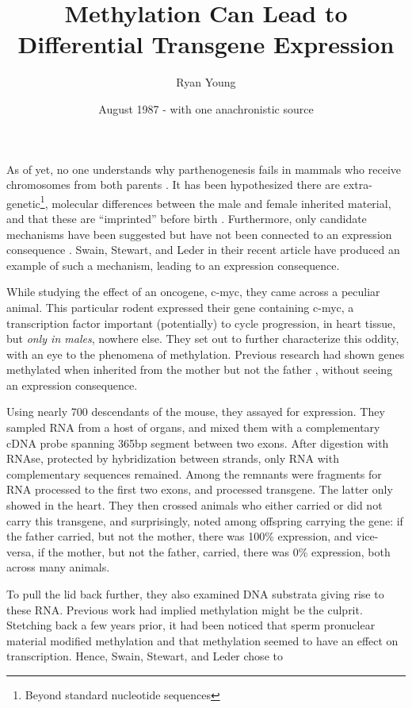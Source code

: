 \documentclass[twocolumn]{article}
\title{{\Large Methylation Can Lead to Differential Transgene Expression}}
\author{\large Ryan Young}
\date{August 1987 - with one anachronistic source}
\begin{document}
\maketitle


As of yet, no one understands why parthenogenesis fails in mammals who receive chromosomes from both parents \citep{solter}\citep{surani}. It has been hypothesized there are extra-genetic\footnote{Beyond standard nucleotide sequences}, molecular differences between the male and female inherited material, and that these are ``imprinted'' before birth \citep{surani}. Furthermore, only candidate mechanisms have been suggested but have not been connected to an expression consequence \citep{reik}. Swain, Stewart, and Leder in their recent article have produced an example of such a mechanism, leading to an expression consequence.

While studying the effect of an oncogene, c-myc, they came across a peculiar animal. This particular rodent expressed their gene containing c-myc, a transcription factor important (potentially) to cycle progression\citep{cymc}, in heart tissue, but \textit{only in males}, nowhere else. They set out to further characterize this oddity, with an eye to the phenomena of methylation. Previous research had shown genes methylated when inherited from the mother but not the father \citep{surani}, without seeing an expression consequence.

Using nearly 700 descendants of the mouse, they assayed for expression. They sampled RNA
from a host of organs, and mixed them with a complementary cDNA probe spanning 365bp segment between two exons. After digestion with RNAse, protected by hybridization between strands, only RNA with complementary sequences remained. Among the remnants were fragments for RNA processed to the first two exons, and processed transgene. The latter only showed in the heart. They then crossed animals who either carried or did not carry this transgene, and surprisingly, noted among offspring carrying the gene: if the father carried, but not the mother, there was 100\% expression, and vice-versa, if the mother, but not the father, carried, there was 0\% expression, both across many animals. 

To pull the lid back further, they also examined DNA substrata giving rise to these RNA. Previous work had implied methylation might be the culprit. Stetching back a few years prior, it had been noticed that sperm pronuclear material modified methylation\citep{} and that methylation seemed to have an effect on transcription\citep{}. Hence, Swain, Stewart, and Leder chose to 



 

\end{document}
